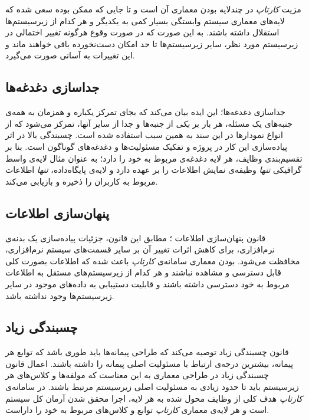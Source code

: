 مزیت \textit{کارتاپ} در چندلایه بودن معماری آن است و تا جایی که ممکن بوده سعی شده که لایه‌های معماری سیستم وابستگی بسیار کمی به یکدیگر و هر کدام از زیرسیستم‌ها استقلال داشته باشند. به این صورت که در صورت وقوع هرگونه تغییر اختمالی در زیرسیستم مورد نظر، سایر زیرسیستم‌ها تا حد امکان دست‌نخورده باقی خواهند ماند و این تغییرات به‌ آسانی صورت می‌گیرد.

\subsection{جداسازی دغدغه‌ها}
جداسازی دغدغه‌ها؛ این ایده بیان می‌کند که بجای تمرکز یکباره و همزمان به همه‌ی جنبه‌های یک مسئله، هر بار بر \textit{یکی} از جنبه‌ها و جدا از سایر آنها، تمرکز می‌شود که از انواع نمودار‌ها در این سند به همین سبب استفاده شده است. چسبندگی بالا در اثر پیاده‌سازی این کار در پروژه و تفکیک مسئولیت‌ها و دغدغه‌های گوناگون است. بنا بر تقسیم‌بندی وظایف، هر لایه دغدغه‌ی مربوط به خود را دارد؛ به عنوان مثال لایه‌ی واسط گرافیکی \textit{تنها} وظیفه‌ی نمایش اطلاعات را بر عهده دارد و لایه‌ی پایگاه‌داده، \textit{تنها} اطلاعات مربوط به کاربران را ذخیره و بازیابی می‌کند.

\subsection{پنهان‌سازی اطلاعات}
قانون پنهان‌سازی اطلاعات
؛
مطابق این قانون، جزئیات پیاده‌سازی یک بدنه‌ی نرم‌افزاری، برای کاهش اثرات تغییر آن بر سایر قسمت‌های سیستم نرم‌افزاری، مخافظت می‌شود.  بودن معماری سامانه‌ی \textit{کارتاپ} باعث شده که اطلاعات بصورت کلی قابل دسترسی و مشاهده نباشند و هر کدام از زیرسیستم‌های مستقل به اطلاعات مربوط به خود دسترسی داشته باشند و قابلیت دستیبابی به داده‌های موجود در سایر زیرسیستم‌ها وجود نداشته باشد.

\subsection{چسبندگی زیاد}
قانون چسبندگی زیاد توصیه می‌کند که طراحی پیمانه‌ها
 باید طوری باشد که توابع هر پیمانه، بیشترین درجه‌ی ارتباط با مسئولیت اصلی پیمانه را داشته باشند. اعمال قانون چسبندگی زیاد در طراحی معماری به این معناست که مولفه‌ها و کلاس‌های هر زیرسیستم باید تا حدود زیادی به مسئولیت اصلی زیرسیستم مرتبط باشند. در سامانه‌ی \textit{کارتاپ} هدف کلی از وظایف محول شده به هر لایه، اجرا محقق شدن آرمان کل سیستم است و هر لایه‌ی معماری \textit{کارتاپ} توابع و کلاس‌های مربوط به خود را داراست.

